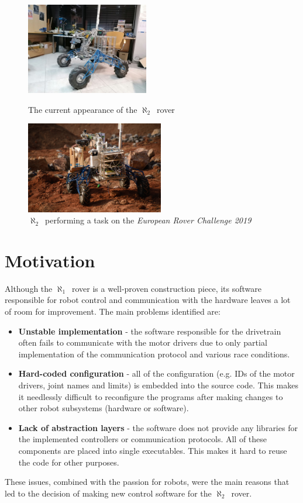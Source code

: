 \documentclass[english,inz,shortabstract]{iithesis}
\newcommand{\oldrovername}{$\aleph_1$\ }
\newcommand{\rovername}{$\aleph_2$\ }
\begin{document}
\begin{figure}[ht]
    \hspace*{\fill}
    \begin{minipage}{.45\textwidth}
      \centering
      \includegraphics[height=4cm]{img/lazik1.jpg}
      \caption{The current appearance of the \rovername rover}
      \label{fig:lazik1}
    \end{minipage}
    \hfill
    \begin{minipage}{.45\textwidth}
      \centering
      \includegraphics[height=4cm]{img/lazik2.jpg}
      \caption{\rovername performing a task on the \textit{European Rover Challenge 2019}}
      \label{fig:lazik2}
    \end{minipage}
    \hspace*{\fill}
\end{figure}

\section{Motivation}
Although the \oldrovername rover is a well-proven construction piece, its software responsible for robot control and communication with the hardware leaves a lot of room for improvement. The main problems identified are:
\begin{itemize}
    \item \textbf{Unstable implementation} - the software responsible for the drivetrain often fails to communicate with the motor drivers due to only partial implementation of the communication protocol and various race conditions.
    \item \textbf{Hard-coded configuration} - all of the configuration (e.g. IDs of the motor drivers, joint names and limits) is embedded into the source code. This makes it needlessly difficult to reconfigure the programs after making changes to other robot subsystems (hardware or software).
    \item \textbf{Lack of abstraction layers} - the software does not provide any libraries for the implemented controllers or communication protocols. All of these components are placed into single executables. This makes it hard to reuse the code for other purposes.
\end{itemize}
These issues, combined with the passion for robots, were the main reasons that led to the decision of making new control software for the \rovername rover.
\end{document}
